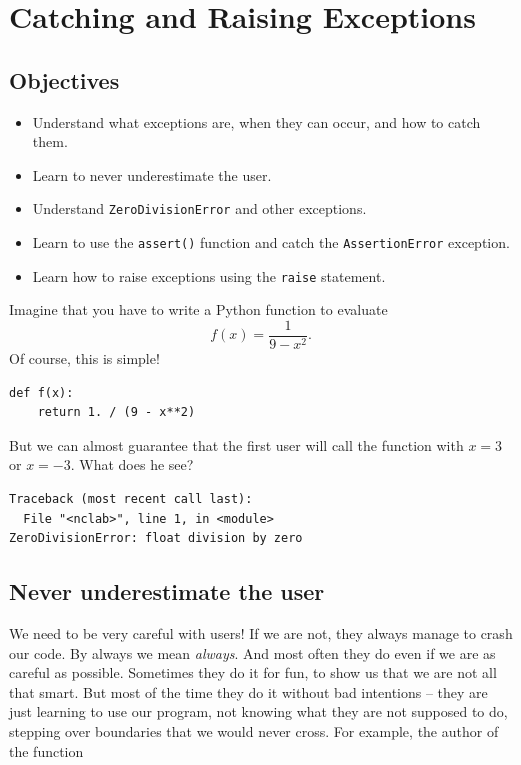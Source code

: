 \section{Catching and Raising Exceptions}

\subsection{Objectives}

\begin{itemize}
\item Understand what exceptions are, when they can occur, and how to catch them.
\item Learn to never underestimate the user.
\item Understand {\tt ZeroDivisionError} and other exceptions.
\item Learn to use the {\tt assert()} function and catch the {\tt AssertionError} exception.
\item Learn how to raise exceptions using the {\tt raise} statement.
\end{itemize}
Imagine that you have to write a Python function to evaluate
$$
f(x) = \frac{1}{9 - x^2}.
$$
Of course, this is simple!

\begin{verbatim}
def f(x):
    return 1. / (9 - x**2)
\end{verbatim}
But we can almost guarantee that the first user will call the 
function with $x = 3$ or $x = -3$. What does he see?

\begin{verbatim}
Traceback (most recent call last):
  File "<nclab>", line 1, in <module>
ZeroDivisionError: float division by zero
\end{verbatim}

\subsection{Never underestimate the user}

We need to be very careful with users! If we are not, they always manage
to crash our code. By always we mean {\em always}. And most often they do even
if we are as careful as possible. Sometimes they do it for fun, to show us that we are not all that smart.
But most of the time they do it without bad intentions -- they are just learning to use our
program, not knowing what they are not supposed to do, stepping over boundaries that we would 
never cross. For example, the author of the function 


